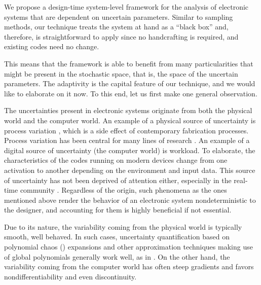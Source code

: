 We propose a design-time system-level framework for the analysis of electronic
systems that are dependent on uncertain parameters. Similar to sampling methods,
our technique treats the system at hand as a ``black box'' and, therefore, is
straightforward to apply since no handcrafting is required, and existing codes
need no change. 

 This means that
the framework is able to benefit from many particularities that might be present
in the stochastic space, that is, the space of the uncertain parameters. The
adaptivity is the capital feature of our technique, and we would like to
elaborate on it now. To this end, let us first make one general observation.

The uncertainties present in electronic systems originate from both the physical
world and the computer world. An example of a physical source of uncertainty is
process variation \cite{srivastava2005}, which is a side effect of contemporary
fabrication processes. Process variation has been central for many lines of
research \cite{bhardwaj2008, juan2012, lee2013, ukhov2014, ukhov2015}. An
example of a digital source of uncertainty (the computer world) is workload. To
elaborate, the characteristics of the codes running on modern devices change
from one activation to another depending on the environment and input data. This
source of uncertainty has not been deprived of attention either, especially in
the real-time community \cite{quinton2012, diaz2002, santinelli2011,
tanasa2015}. Regardless of the origin, such phenomena as the ones mentioned
above render the behavior of an electronic system nondeterministic to the
designer, and accounting for them is highly beneficial if not essential.


Due to its nature, the variability coming from the physical world is typically
smooth, well behaved. In such cases, uncertainty quantification based on
polynomial chaos () expansions \cite{xiu2010} and other approximation
techniques making use of global polynomials generally work well, as in
\cite{bhardwaj2008, lee2013, ukhov2014, ukhov2015}. On the other hand, the
variability coming from the computer world has often steep gradients and favors
nondifferentiability and even discontinuity. 

